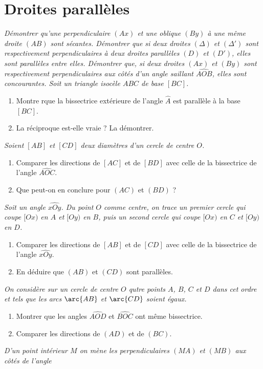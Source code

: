 \chapter{Droites parallèles}

\begin{itemize}
\it Démontrer qu'une perpendiculaire $(Ax)$ et une oblique $(By)$ à une même droite $(AB)$ sont sécantes.
\it Démontrer que si deux droites $(\Delta)$ et $(\Delta')$ sont respectivement perpendiculaires à deux droites parallèles $(D)$ et $(D')$, elles sont parallèles entre elles. 
\it Démontrer que, si deux droites $(Ax)$ et $(By)$ sont respectivement perpendiculaires aux côtés d'un angle saillant $\widehat{AOB}$, elles sont concourantes. 
\it Soit un triangle isocèle $ABC$ de base $[BC]$. \begin{enumerate}
\item Montre rque la bissectrice extérieure de l'angle $\widehat{A}$ est parallèle à la base $[BC]$.
\item La réciproque est-elle vraie ? La démontrer.
\end{enumerate}
\it Soient $[AB]$ et $[CD]$ deux diamètres d'un cercle de centre $O$.
\begin{enumerate}
\item Comparer les directions de $[AC]$ et de $[BD]$ avec celle de la bissectrice de l'angle $\widehat{AOC}$.
\item Que peut-on en conclure pour $(AC)$ et $(BD)$ ?
\end{enumerate}
\it Soit un angle $\widehat{xOy}$. Du point $O$ comme centre, on trace un premier cercle qui coupe $[Ox)$ en $A$ et $[Oy)$ en $B$, puis un second cercle qui coupe $[Ox)$ en $C$ et $[Oy)$ en $D$. 
\begin{enumerate}
\item Comparer les directions de $[AB]$ et de $[CD]$ avec celle de la bissectrice de l'angle $\widehat{xOy}$.
\item En déduire que $(AB)$ et $(CD)$ sont parallèles.
\end{enumerate}
\it On considère sur un cercle de centre $O$ qutre points $A$, $B$, $C$ et $D$ dans cet ordre et tels que les arcs $\arc{AB}$ et $\arc{CD}$ soient égaux. 
\begin{enumerate}
\item Montrer que les angles $\widehat{AOD}$ et $\widehat{BOC}$ ont même bissectrice.
\item Comparer les directions de $(AD)$ et de $(BC)$.
\end{enumerate}
\it D'un point intérieur $M$ on mène les perpendiculaires $(MA)$ et $(MB)$ aux côtés de l'angle

\end{itemize}
